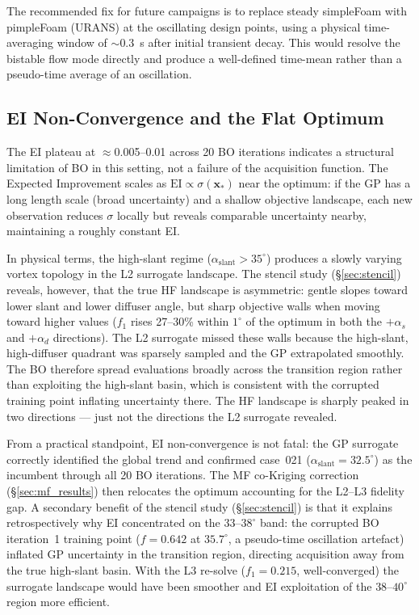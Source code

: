 The recommended fix for future campaigns is to replace steady simpleFoam with pimpleFoam (URANS) at the oscillating design points, using a physical time-averaging window of ${\sim}0.3$~s after initial transient decay. This would resolve the bistable flow mode directly and produce a well-defined time-mean rather than a pseudo-time average of an oscillation.

\subsection{EI Non-Convergence and the Flat Optimum}
\label{sec:flat_optimum}

The EI plateau at $\approx$0.005--0.01 across 20 BO iterations indicates a structural limitation of BO in this setting, not a failure of the acquisition function. The Expected Improvement scales as $\mathrm{EI} \propto \sigma(\mathbf{x}_*)$ near the optimum: if the GP has a long length scale (broad uncertainty) and a shallow objective landscape, each new observation reduces $\sigma$ locally but reveals comparable uncertainty nearby, maintaining a roughly constant EI.

In physical terms, the high-slant regime ($\alpha_\mathrm{slant} > 35^\circ$) produces a slowly varying vortex topology in the L2 surrogate landscape. The stencil study (\S\ref{sec:stencil}) reveals, however, that the true HF landscape is asymmetric: gentle slopes toward lower slant and lower diffuser angle, but sharp objective walls when moving toward higher values ($f_1$ rises 27--30\% within $1^\circ$ of the optimum in both the $+\alpha_s$ and $+\alpha_d$ directions). The L2 surrogate missed these walls because the high-slant, high-diffuser quadrant was sparsely sampled and the GP extrapolated smoothly. The BO therefore spread evaluations broadly across the transition region rather than exploiting the high-slant basin, which is consistent with the corrupted training point inflating uncertainty there. The HF landscape is sharply peaked in two directions — just not the directions the L2 surrogate revealed.

From a practical standpoint, EI non-convergence is not fatal: the GP surrogate correctly identified the global trend and confirmed case~021 ($\alpha_\mathrm{slant}=32.5^\circ$) as the incumbent through all 20 BO iterations. The MF co-Kriging correction (\S\ref{sec:mf_results}) then relocates the optimum accounting for the L2--L3 fidelity gap. A secondary benefit of the stencil study (\S\ref{sec:stencil}) is that it explains retrospectively why EI concentrated on the $33$--$38^\circ$ band: the corrupted BO iteration~1 training point ($f=0.642$ at $35.7^\circ$, a pseudo-time oscillation artefact) inflated GP uncertainty in the transition region, directing acquisition away from the true high-slant basin. With the L3 re-solve ($f_1=0.215$, well-converged) the surrogate landscape would have been smoother and EI exploitation of the $38$--$40^\circ$ region more efficient.

